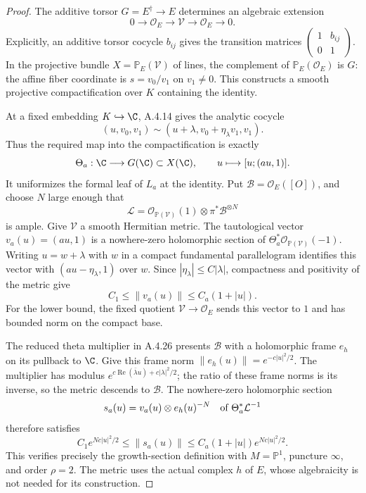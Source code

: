 \begin{proof}
The additive torsor $G=E^\dagger\to E$ determines an algebraic
extension
\[
 0\longrightarrow\mathcal O_E\longrightarrow\mathcal V
 \longrightarrow\mathcal O_E\longrightarrow0.
\]
Explicitly, an additive torsor cocycle $b_{ij}$ gives the transition
matrices $\left(\begin{smallmatrix}1&b_{ij}\\0&1\end{smallmatrix}\right)$.
In the projective bundle $X=\mathbb P_E(\mathcal V)$ of lines,
the complement of $\mathbb P_E(\mathcal O_E)$ is $G$:
the affine fiber coordinate is $s=v_0/v_1$ on $v_1\ne0$.
This constructs a smooth projective compactification over $K$
containing the identity.

At a fixed embedding $K\hookrightarrow\C$, A.4.14 gives the
analytic cocycle
\[
 (u,v_0,v_1)\sim
 (u+\lambda,v_0+\eta_\lambda v_1,v_1).
\]
Thus the required map into the compactification is exactly
\[
 \Theta_a:\C\longrightarrow G(\C)\subset X(\C),\qquad
 u\longmapsto[u;(au,1)].
\]
It uniformizes the formal leaf of $L_a$ at the identity.
Put $\mathcal B=\mathcal O_E([O])$, and choose $N$ large enough
that
\[
 \mathcal L=\mathcal O_{\mathbb P(\mathcal V)}(1)
                  \otimes\pi^*\mathcal B^{\otimes N}
\]
is ample. Give $\mathcal V$ a smooth Hermitian metric. The
tautological vector $v_a(u)=(au,1)$ is a nowhere-zero holomorphic
section of $\Theta_a^*\mathcal O_{\mathbb P(\mathcal V)}(-1)$.
Writing $u=w+\lambda$ with $w$ in a compact fundamental
parallelogram identifies this vector with
$(au-\eta_\lambda,1)$ over $w$. Since
$|\eta_\lambda|\le C|\lambda|$, compactness and positivity of
the metric give
\[
 C_1\le\|v_a(u)\|\le C_a(1+|u|).
\]
For the lower bound, the fixed quotient
$\mathcal V\to\mathcal O_E$ sends this vector to $1$ and has
bounded norm on the compact base.

The reduced theta multiplier in A.4.26 presents
$\mathcal B$ with a holomorphic frame $e_h$ on its pullback
to $\C$. Give this frame norm
$\|e_h(u)\|=e^{-c|u|^2/2}$.
The multiplier has modulus
$e^{c\operatorname{Re}(\bar\lambda u)+c|\lambda|^2/2}$;
the ratio of these frame norms is its inverse, so the metric
descends to $\mathcal B$.
The nowhere-zero holomorphic section
\[
 s_a(u)=v_a(u)\otimes e_h(u)^{-N}
       \quad\hbox{of }\Theta_a^*\mathcal L^{-1}
\]
therefore satisfies
\[
 C_1e^{Nc|u|^2/2}\le\|s_a(u)\|
      \le C_a(1+|u|)e^{Nc|u|^2/2}.                 \tag{*}
\]
This verifies precisely the growth-section definition
\cite[Definition 5.1, p.29; Definitions 5.4--5.5, p.31]{EllHerblot2012}
with $M=\mathbb P^1$, puncture $\infty$, and order $\rho=2$.
The metric uses the actual complex $h$ of $E$, whose algebraicity
is not needed for its construction.


\end{proof}
